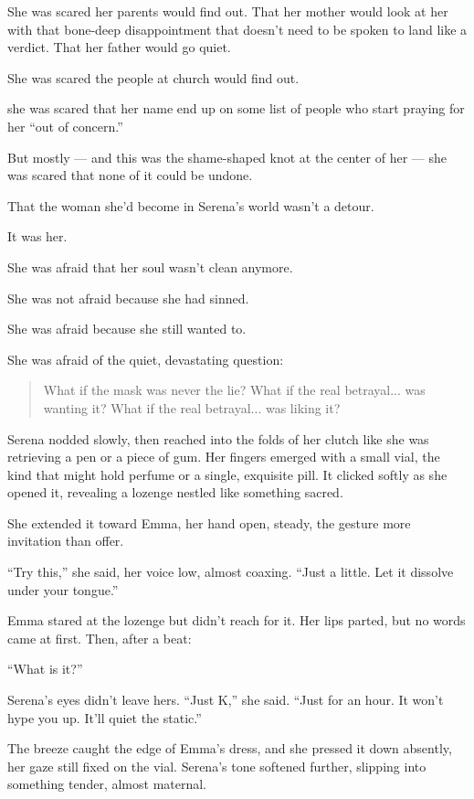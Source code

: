 She was scared her parents would find out.
That her mother would look at her with that bone-deep disappointment that doesn’t need to be spoken to 
land like a verdict.
That her father would go quiet.

She was scared the people at church would find out.

she was scared that her name end up on some list of people who start praying for her “out of concern.”

But mostly --- and this was the shame-shaped knot at the center of her ---
she was scared that none of it could be undone.

That the woman she’d become in Serena’s world wasn’t a detour.

It was her.

She was afraid  that her soul wasn’t clean anymore. 

She was not afraid because she had sinned. 

She was afraid because she still wanted to.

She was afraid of the quiet, devastating question:

\begin{quote}
What if the mask was never the lie?
What if the real betrayal... was wanting it?
What if the real betrayal... was liking it?
\end{quote}

Serena nodded slowly, then reached into the folds of her clutch like she was retrieving a pen 
or a piece of gum. Her fingers emerged with a small vial, the kind that might hold perfume or a single, 
exquisite pill. It clicked softly as she opened it, revealing a lozenge nestled like something sacred.

She extended it toward Emma, her hand open, steady, the gesture more invitation than offer.

``Try this,'' she said, her voice low, almost coaxing. ``Just a little. Let it dissolve under your tongue.''

Emma stared at the lozenge but didn’t reach for it. Her lips parted, but no words came at first. Then, 
after a beat:

``What is it?''

Serena’s eyes didn’t leave hers. ``Just K,'' she said. ``Just for an hour. It won’t hype you up. It’ll 
quiet the static.''

The breeze caught the edge of Emma’s dress, and she pressed it down absently, her gaze still fixed 
on the vial. Serena’s tone softened further, slipping into something tender, almost maternal.

